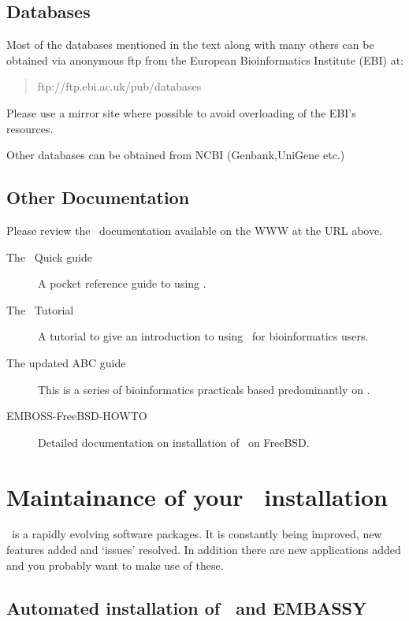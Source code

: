 \documentclass{report}
\begin{document}
\subsection{Databases}

Most of the databases mentioned in the text along with many others can
be obtained via anonymous ftp from the European Bioinformatics
Institute (EBI) at:
\begin{quote}
ftp://ftp.ebi.ac.uk/pub/databases
\end{quote}
Please use a mirror site where possible to avoid overloading of the
EBI's resources.

Other databases can be obtained from NCBI (Genbank,UniGene etc.)

\subsection{Other Documentation}
Please review the \EMBOSS\ documentation available on the WWW at the
URL above.

\begin{description}
\item[The \EMBOSS\ Quick guide]A pocket reference guide to using
\EMBOSS{}.
\item[The \EMBOSS\ Tutorial]A tutorial to give an introduction to
using \EMBOSS\ for bioinformatics
users.
\item[The updated ABC guide]This is a series of bioinformatics
practicals based predominantly on
\EMBOSS.
\item[EMBOSS-FreeBSD-HOWTO]Detailed documentation on installation of
\EMBOSS\ on
FreeBSD.
\end{description}

\section{Maintainance of your \EMBOSS\ installation}

\EMBOSS\ is a rapidly evolving software packages. It is constantly
being improved, new features added and `issues' resolved. In addition
there are new applications added and you probably want to make use of
these.

\subsection{Automated installation of \EMBOSS\ and EMBASSY}
\end{document}
